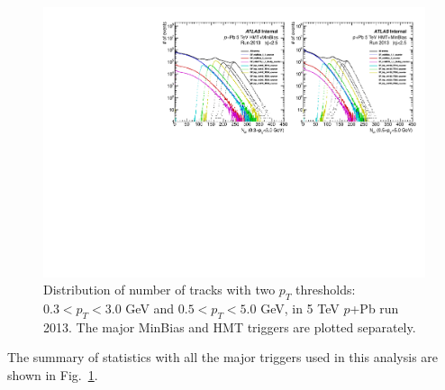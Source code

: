 \begin{figure}[H]
\centering
\includegraphics[width=.9\linewidth]{figs/sec_evtSlc/trkDis_pPb5_run1.pdf}
\caption{Distribution of number of tracks with two $p_{T}$ thresholds: $0.3<p_{T}<3.0$ GeV and $0.5<p_{T}<5.0$ GeV, in 5 TeV $p$+Pb run 2013. The major MinBias and HMT triggers are plotted separately.}
\label{fig:trkDis_pPb5_run1}
\end{figure}
The summary of statistics with all the major triggers used in this analysis are shown in Fig.~\ref{fig:trkDis_pPb5_run1}.

